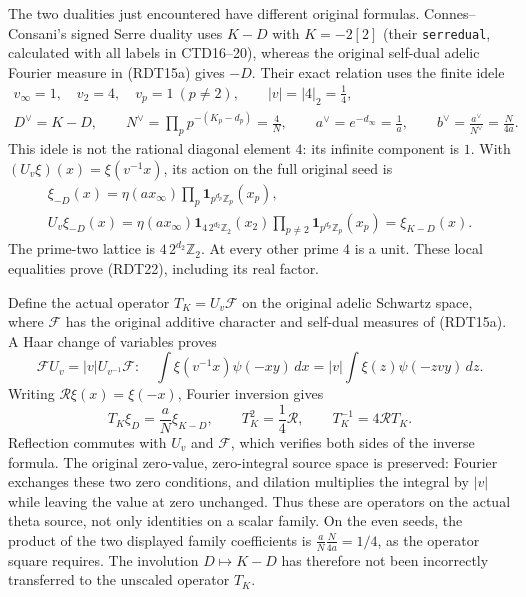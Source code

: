 The two dualities just encountered have different original formulas.
Connes--Consani's signed Serre duality uses $K-D$ with $K=-2[2]$
(their \texttt{serredual}, calculated with all labels in CTD16--20),
whereas the original self-dual adelic Fourier measure in (RDT15a)
gives $-D$. Their exact relation uses the finite idele
\begin{equation}\tag{RDT21}
\begin{gathered}
v_\infty=1,\quad v_2=4,\quad v_p=1\ (p\ne2),\qquad
|v|=|4|_2=\frac14,\\
D^\vee=K-D,\qquad
N^\vee=\prod_p p^{-(K_p-d_p)}=\frac4N,\qquad
a^\vee=e^{-d_\infty}=\frac1a,\qquad
b^\vee=\frac{a^\vee}{N^\vee}=\frac{N}{4a}.
\end{gathered}
\end{equation}
This idele is not the rational diagonal element $4$: its infinite
component is $1$. With $(U_v\xi)(x)=\xi(v^{-1}x)$, its action on
the full original seed is
\begin{equation}\tag{RDT22}
\begin{gathered}
\xi_{-D}(x)=\eta(ax_\infty)
               \prod_p\mathbf1_{p^{d_p}\mathbb Z_p}(x_p),\\
U_v\xi_{-D}(x)=\eta(ax_\infty)
 \mathbf1_{4\,2^{d_2}\mathbb Z_2}(x_2)
 \prod_{p\ne2}\mathbf1_{p^{d_p}\mathbb Z_p}(x_p)
 =\xi_{K-D}(x).
\end{gathered}
\end{equation}
The prime-two lattice is $4\,2^{d_2}\mathbb Z_2$.
At every other prime $4$ is a unit.
These local equalities prove (RDT22), including its real factor.

Define the actual operator $T_K=U_v\mathcal F$ on the original
adelic Schwartz space, where $\mathcal F$ has the original additive
character and self-dual measures of (RDT15a). A Haar change of
variables proves
\[
\mathcal F U_v=|v|U_{v^{-1}}\mathcal F:
\quad\int\xi(v^{-1}x)\psi(-xy)\,dx
       =|v|\int\xi(z)\psi(-zvy)\,dz.
\]
Writing $\mathcal R\xi(x)=\xi(-x)$, Fourier inversion gives
\begin{equation}\tag{RDT23}
T_K\xi_D=\frac aN\xi_{K-D},\qquad
T_K^2=\frac14\mathcal R,\qquad
T_K^{-1}=4\mathcal R T_K.
\end{equation}
Reflection commutes with $U_v$ and $\mathcal F$, which verifies both
sides of the inverse formula. The original zero-value, zero-integral
source space is preserved: Fourier exchanges these two zero
conditions, and dilation multiplies the integral by $|v|$ while
leaving the value at zero unchanged. Thus these are operators on the
actual theta source, not only identities on a scalar family. On the
even seeds, the product of the two displayed family coefficients is
$\frac aN\frac{N}{4a}=1/4$, as the operator square requires.
The involution $D\mapsto K-D$ has therefore not been incorrectly
transferred to the unscaled operator $T_K$.

